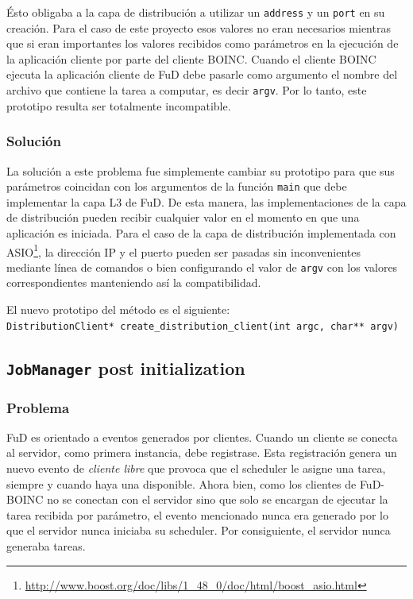 Ésto obligaba a la capa de distribución a utilizar un \texttt{address} y un \texttt{port} en su creación. Para el caso de este proyecto esos valores no eran necesarios mientras que si eran importantes los valores recibidos como parámetros en la ejecución de la aplicación cliente por parte del cliente BOINC. Cuando el cliente BOINC ejecuta la aplicación cliente de FuD debe pasarle como argumento el nombre del archivo que contiene la tarea a computar, es decir \texttt{argv}. Por lo tanto, este prototipo resulta ser totalmente incompatible. 

\subsubsection{Solución}
La solución a este problema fue simplemente cambiar su prototipo para que sus parámetros coincidan con los argumentos de la función \texttt{main} que debe implementar la capa L3 de FuD. De esta manera, las implementaciones de la capa de distribución pueden recibir cualquier valor en el momento en que una aplicación es iniciada. Para el caso de la capa de distribución implementada con ASIO\footnote{\url{http://www.boost.org/doc/libs/1_48_0/doc/html/boost_asio.html}}, la dirección IP y el puerto pueden ser pasadas sin inconvenientes mediante línea de comandos o bien configurando el valor de \texttt{argv} con los valores correspondientes manteniendo así la compatibilidad.

El nuevo prototipo del método es el siguiente:\\

\texttt{DistributionClient* create\_distribution\_client(int argc, char** argv)}\\


\subsection{\texttt{JobManager} post initialization}
\label{seccion:jobmanager:post:init}

	\subsubsection{Problema}
FuD es orientado a eventos generados por clientes. Cuando un cliente se conecta al servidor, como primera instancia, debe registrase. Esta registración genera un nuevo evento de \textit{cliente libre} que provoca que el scheduler le asigne una tarea, siempre y cuando haya una disponible. Ahora bien, como los clientes de FuD-BOINC no se conectan con el servidor sino que solo se encargan de ejecutar la tarea recibida por parámetro, el evento mencionado nunca era generado por lo que el servidor nunca iniciaba su scheduler. Por consiguiente, el servidor nunca generaba tareas.
	
